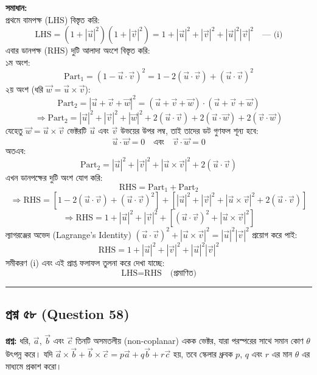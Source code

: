 \documentclass[12pt]{article}
\begin{document}
\textbf{সমাধান:} \\
প্রথমে বামপক্ষ (LHS) বিস্তৃত করি:
$$\text{LHS} = (1 + |\vec{u}|^2)(1 + |\vec{v}|^2) = 1 + |\vec{u}|^2 + |\vec{v}|^2 + |\vec{u}|^2 |\vec{v}|^2 \quad \text{--- (i)}$$
এবার ডানপক্ষ (RHS) দুটি আলাদা অংশে বিস্তৃত করি: \\
১ম অংশ:
$$\text{Part}_1 = (1 - \vec{u} \cdot \vec{v})^2 = 1 - 2(\vec{u} \cdot \vec{v}) + (\vec{u} \cdot \vec{v})^2$$
২য় অংশ (ধরি $\vec{w} = \vec{u} \times \vec{v}$):
$$\text{Part}_2 = |\vec{u} + \vec{v} + \vec{w}|^2 = (\vec{u} + \vec{v} + \vec{w}) \cdot (\vec{u} + \vec{v} + \vec{w})$$
$$\Rightarrow \text{Part}_2 = |\vec{u}|^2 + |\vec{v}|^2 + |\vec{w}|^2 + 2(\vec{u} \cdot \vec{v}) + 2(\vec{u} \cdot \vec{w}) + 2(\vec{v} \cdot \vec{w})$$
যেহেতু $\vec{w} = \vec{u} \times \vec{v}$ ভেক্টরটি $\vec{u}$ এবং $\vec{v}$ উভয়ের উপর লম্ব, তাই তাদের ডট গুণফল শূন্য হবে:
$$\vec{u} \cdot \vec{w} = 0 \quad \text{এবং} \quad \vec{v} \cdot \vec{w} = 0$$
অতএব:
$$\text{Part}_2 = |\vec{u}|^2 + |\vec{v}|^2 + |\vec{u} \times \vec{v}|^2 + 2(\vec{u} \cdot \vec{v})$$
এখন ডানপক্ষের দুটি অংশ যোগ করি:
$$\text{RHS} = \text{Part}_1 + \text{Part}_2$$
$$\Rightarrow \text{RHS} = [1 - 2(\vec{u} \cdot \vec{v}) + (\vec{u} \cdot \vec{v})^2] + [|\vec{u}|^2 + |\vec{v}|^2 + |\vec{u} \times \vec{v}|^2 + 2(\vec{u} \cdot \vec{v})]$$
$$\Rightarrow \text{RHS} = 1 + |\vec{u}|^2 + |\vec{v}|^2 + \left[ (\vec{u} \cdot \vec{v})^2 + |\vec{u} \times \vec{v}|^2 \right]$$
ল্যাগরঞ্জের অভেদ (Lagrange's Identity) $(\vec{u} \cdot \vec{v})^2 + |\vec{u} \times \vec{v}|^2 = |\vec{u}|^2 |\vec{v}|^2$ প্রয়োগ করে পাই:
$$\text{RHS} = 1 + |\vec{u}|^2 + |\vec{v}|^2 + |\vec{u}|^2 |\vec{v}|^2$$
সমীকরণ (i) এবং এই প্রাপ্ত ফলাফল তুলনা করে দেখা যাচ্ছে:
$$\text{LHS} = \text{RHS} \quad \text{(প্রমাণিত)}$$

\vspace{0.8cm}

\noindent\rule{\textwidth}{1pt}
\subsection*{প্রশ্ন ৫৮ (Question 58)}

\textbf{প্রশ্ন:} ধরি, $\vec{a}$, $\vec{b}$ এবং $\vec{c}$ তিনটি অসমতলীয় (non-coplanar) একক ভেক্টর, যারা পরস্পরের সাথে সমান কোণ $\theta$ উৎপন্ন করে। যদি $\vec{a} \times \vec{b} + \vec{b} \times \vec{c} = p\vec{a} + q\vec{b} + r\vec{c}$ হয়, তবে স্কেলার ধ্রুবক $p$, $q$ এবং $r$ এর মান $\theta$ এর মাধ্যমে প্রকাশ করো।
\end{document}

